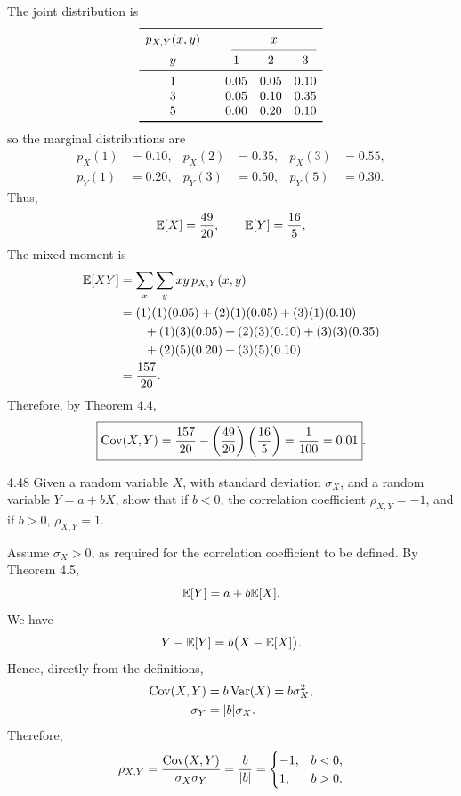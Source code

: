 \documentclass[11pt,oneside]{article}
\begin{document}
\begin{solution}
The joint distribution is
\[
\begin{array}{c@{\qquad}ccc}
\toprule
p_{X,Y}(x,y) & \multicolumn{3}{c}{x} \\
\cmidrule(lr){2-4}
y & 1 & 2 & 3 \\
\midrule
1 & 0.05 & 0.05 & 0.10 \\
3 & 0.05 & 0.10 & 0.35 \\
5 & 0.00 & 0.20 & 0.10 \\
\bottomrule
\end{array}
\]
so the marginal distributions are
\[
\begin{aligned}
    p_X(1)&=0.10, & p_X(2)&=0.35, & p_X(3)&=0.55,\\
    p_Y(1)&=0.20, & p_Y(3)&=0.50, & p_Y(5)&=0.30.
\end{aligned}
\]
Thus,
\[
    \mathbb{E}[X]=\frac{49}{20},
    \qquad
    \mathbb{E}[Y]=\frac{16}{5},
\]
The mixed moment is
\[
\begin{aligned}
    \mathbb{E}[XY]
    &=\sum_x\sum_y xy\,p_{X,Y}(x,y)\\
    &=(1)(1)(0.05)+(2)(1)(0.05)+(3)(1)(0.10)\\
    &\qquad +(1)(3)(0.05)+(2)(3)(0.10)+(3)(3)(0.35)\\
    &\qquad +(2)(5)(0.20)+(3)(5)(0.10)\\
    &=\frac{157}{20}.
\end{aligned}
\]
Therefore, by Theorem 4.4,
\[
    \boxed{\operatorname{Cov}(X,Y)
    =\frac{157}{20}-\left(\frac{49}{20}\right)\left(\frac{16}{5}\right)
    =\frac1{100}=0.01}.
\]
\end{solution}

\begin{exercise}{4.48}
Given a random variable $X$, with standard deviation $\sigma_X$, and a random variable $Y=a+bX$, show that if $b<0$, the correlation coefficient $\rho_{X,Y}=-1$, and if $b>0$, $\rho_{X,Y}=1$.
\end{exercise}

\begin{solution}
Assume $\sigma_X>0$, as required for the correlation coefficient to be defined. By Theorem 4.5,
\[
    \mathbb{E}[Y]=a+b\mathbb{E}[X].
\]
We have
\[
    Y-\mathbb{E}[Y]=b\bigl(X-\mathbb{E}[X]\bigr).
\]
Hence, directly from the definitions,
\[
\begin{aligned}
    \operatorname{Cov}(X,Y)
    &=b\operatorname{Var}(X)=b\sigma_X^2,\\
    \sigma_Y
    &=|b|\sigma_X.
\end{aligned}
\]
Therefore,
\[
    \rho_{X,Y}
    =\frac{\operatorname{Cov}(X,Y)}{\sigma_X\sigma_Y}
    =\frac{b}{|b|}
    =
    \begin{cases}
        -1, & b<0,\\
        1, & b>0.
    \end{cases}
\]
\end{solution}
\end{document}
